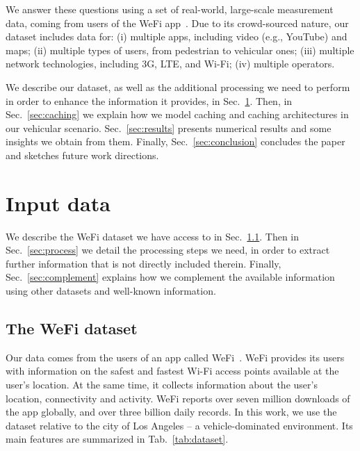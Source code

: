 \documentclass{sig-alternate-05-2015}
\newcommand{\Sec}[1]{Sec.~\ref{sec:#1}}
\newcommand{\Tab}[1]{Tab.~\ref{tab:#1}}
\begin{document}
We answer these questions using a set of real-world, large-scale measurement data, coming from users of the WeFi app~\cite{wefi}. Due to its crowd-sourced nature, our dataset includes data for:
(i) multiple apps, including video (e.g., YouTube) and maps;
(ii) multiple types of users, from pedestrian to vehicular ones;
(iii) multiple network technologies, including 3G, LTE, and Wi-Fi;
(iv) multiple operators.

We describe our dataset, as well as the additional processing we need
to perform in order to enhance the information it provides, in \Sec{dataset}. Then, in \Sec{caching} we explain how we model caching and caching architectures in our vehicular scenario. \Sec{results} presents numerical results and some insights we obtain from them. Finally, \Sec{conclusion} concludes the paper and sketches future work directions.

\section{Input data}
\label{sec:dataset}

We describe the WeFi dataset we have access to in \Sec{wefi}. Then in \Sec{process} we detail the processing steps we need, in order to extract further information that is not directly included therein. Finally, \Sec{complement} explains how we complement the available information using other datasets and well-known information.

\subsection{The WeFi dataset}
\label{sec:wefi}

Our data comes from the users of an app called WeFi~\cite{wefi}.  WeFi
provides its users with information on the safest and fastest Wi-Fi
access points available at the user's location. At the same time, it collects information about the user's
location, connectivity and activity. 
WeFi  reports over seven million downloads of the app globally, and over three billion daily records. In this work, we use the dataset relative to the city of Los Angeles --  a vehicle-dominated environment. Its main features are summarized in \Tab{dataset}.
\end{document}
